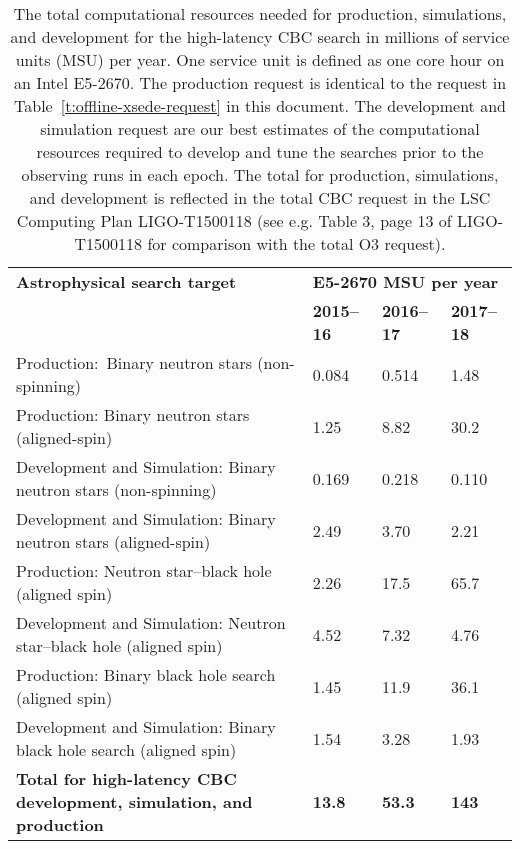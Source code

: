 \begin{table}[!h]
\centering
{\small
\begin{tabular}{|l|l|l|l|}
\hline 
{\bf Astrophysical search target}  & \multicolumn{3}{l|}{\bf E5-2670 MSU per year}\\

{ } &  {\bf 2015--16} & {\bf 2016--17} & {\bf 2017--18}  \\\hline\hline
{ Production:\, Binary neutron stars (non-spinning)} & 0.084 & 0.514 & 1.48 \\\hline
{ Production: Binary neutron stars (aligned-spin)} & 1.25 & 8.82 & 30.2 \\\hline
{ Development and Simulation: Binary neutron stars (non-spinning) } &  0.169 &  0.218 &  0.110 \\\hline
{ Development and Simulation: Binary neutron stars (aligned-spin) } &  2.49 &  3.70 &  2.21 \\\hline\hline
{ Production: Neutron star--black hole (aligned spin) } & 2.26 & 17.5 & 65.7 \\\hline
{ Development and Simulation: Neutron star--black hole (aligned spin) } &  4.52 & 7.32 & 4.76 \\\hline\hline
{ Production: Binary black hole search  (aligned spin) } &1.45 & 11.9 & 36.1 \\\hline
{ Development and Simulation: Binary black hole search  (aligned spin) } & 1.54 & 3.28 & 1.93 \\\hline\hline
{ \bf Total for high-latency CBC development, simulation, and production } & \bf 13.8 & \bf 53.3 & \bf 143 \\\hline
\end{tabular}
}
\caption{\label{t:offline-xsede-all}
The total computational resources needed for production, simulations, and
development for the high-latency CBC search in millions of service units (MSU) per
year. One service unit is defined as one core hour on an Intel\textsuperscript{\textregistered} 
E5-2670.  The production request is identical to the request in Table~\ref{t:offline-xsede-request} in this document. The development and simulation request are our best estimates of the computational resources required to develop and tune the searches prior to the observing runs in each epoch. The total for production, simulations, and
development is reflected in the total CBC request in the LSC Computing Plan
LIGO-T1500118 (see e.g. Table 3, page 13 of LIGO-T1500118 for comparison with
the total O3 request).
}
\end{table}
